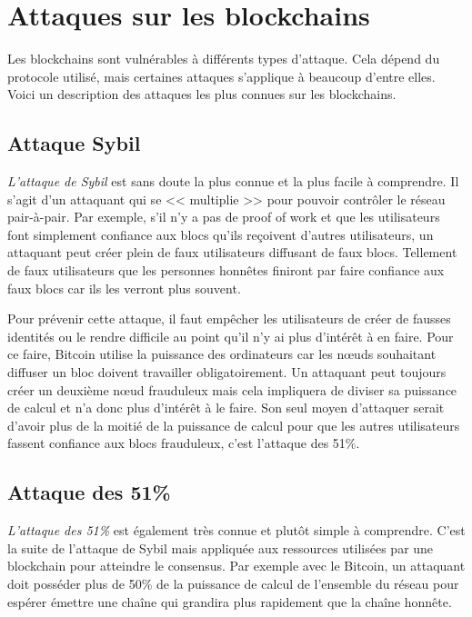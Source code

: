\section{Attaques sur les blockchains}

Les blockchains sont vulnérables à différents types d'attaque. Cela dépend du protocole utilisé, mais certaines attaques s'applique à beaucoup d'entre elles. Voici un description des attaques les plus connues sur les blockchains.

\subsection{Attaque Sybil}

\emph{L'attaque de Sybil} est sans doute la plus connue et la plus facile à comprendre. Il s'agit d'un attaquant qui se << multiplie >> pour pouvoir contrôler le réseau pair-à-pair. Par exemple, s'il n'y a pas de proof of work et que les utilisateurs font simplement confiance aux blocs qu'ils reçoivent d'autres utilisateurs, un attaquant peut créer plein de faux utilisateurs diffusant de faux blocs. Tellement de faux utilisateurs que les personnes honnêtes finiront par faire confiance aux faux blocs car ils les verront plus souvent.

Pour prévenir cette attaque, il faut empêcher les utilisateurs de créer de fausses identités ou le rendre difficile au point qu'il n'y ai plus d'intérêt à en faire. Pour ce faire, Bitcoin utilise la puissance des ordinateurs car les nœuds souhaitant diffuser un bloc doivent travailler obligatoirement. Un attaquant peut toujours créer un deuxième nœud frauduleux mais cela impliquera de diviser sa puissance de calcul et n'a donc plus d'intérêt à le faire. Son seul moyen d'attaquer serait d'avoir plus de la moitié de la puissance de calcul pour que les autres utilisateurs fassent confiance aux blocs frauduleux, c'est l'attaque des 51\%.

\subsection{Attaque des 51\%}

\emph{L'attaque des 51\%} est également très connue et plutôt simple à comprendre. C'est la suite de l'attaque de Sybil mais appliquée aux ressources utilisées par une blockchain pour atteindre le consensus. Par exemple avec le Bitcoin, un attaquant doit posséder plus de 50\% de la puissance de calcul de l'ensemble du réseau pour espérer émettre une chaîne qui grandira plus rapidement que la chaîne honnête.

